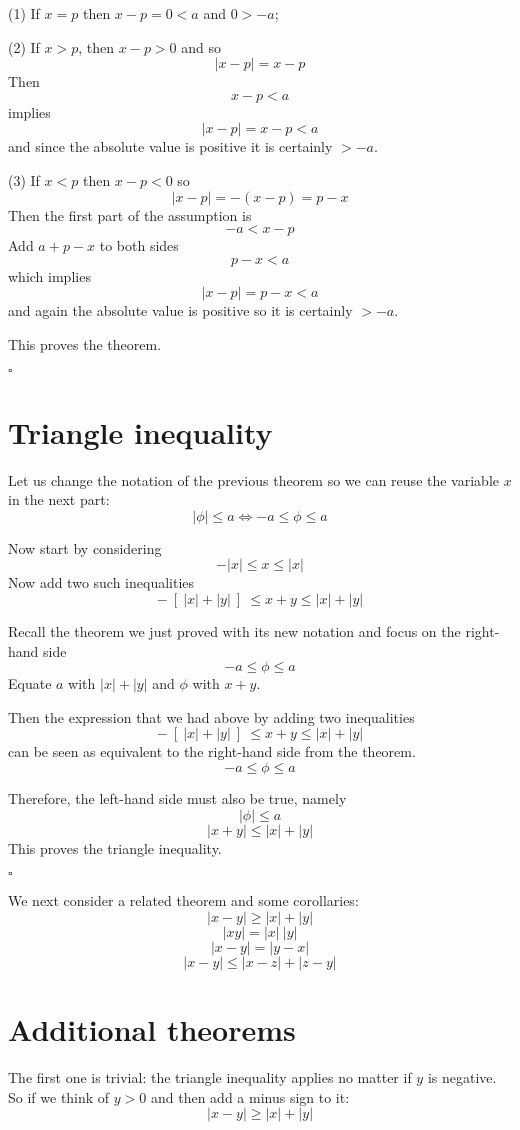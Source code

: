 \documentclass[11pt, oneside]{article}
\begin{document}
(1) If $x = p$ then $x - p = 0 < a$ and $0 > -a$; 

(2) If $x > p$, then $x - p > 0$ and so 
\[ |x - p| = x - p \]
Then
\[ x - p < a \] 
implies 
\[ |x - p| = x - p < a \]
and since the absolute value is positive it is certainly $> -a$.

(3) If $x < p$ then $x - p < 0$ so
\[ |x - p| = -(x-p) = p - x \]
Then the first part of the assumption is
\[ -a < x - p \] 
Add $a + p - x$ to both sides
\[ p - x < a \]
which implies
\[ |x - p| = p - x < a \]
and again the absolute value is positive so it is certainly $> -a$.

This proves the theorem.

$\square$

\section{Triangle inequality}

Let us change the notation of the previous theorem so we can reuse the variable $x$ in the next part:
\[ | \phi | \le a \iff -a \le \phi \le a \]

Now start by considering
\[ - |x| \le x \le |x| \]
Now add two such inequalities 
\[ - \ [ \ |x| +  |y| \ ] \  \le x + y \le  |x| + |y|  \]

Recall the theorem we just proved with its new notation and focus on the right-hand side
\[  -a \le \phi \le a \]
Equate $a$ with $|x| + |y|$ and $\phi$ with $x + y$.  

Then the expression that we had above by adding two inequalities
\[ - \ [ \ |x| +  |y| \ ] \  \le x + y \le  |x| + |y|  \]
can be seen as equivalent to the right-hand side from the theorem.  
\[  -a \le \phi \le a \]

Therefore, the left-hand side must also be true, namely
\[ |\phi| \le a \]
\[ |x + y| \le  |x| +  |y| \]
This proves the triangle inequality.

$\square$


We next consider a related theorem and some corollaries:
\[ |x - y| \ge |x| + |y| \]
\[ |xy| = |x| \ |y| \]
\[ |x - y| = |y - x| \]
\[ |x - y| \le |x - z| + |z - y| \]

\section{Additional theorems}
The first one is trivial:  the triangle inequality applies no matter if $y$ is negative.  So if we think of $y > 0$ and then add a minus sign to it:
\[ |x - y| \ge |x| + |y| \]
\end{document}
